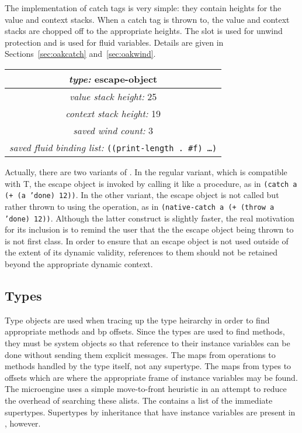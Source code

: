 The implementation of catch tags is very simple: they contain heights
for the value and context stacks.  When a catch tag is thrown to, the
value and context stacks are chopped off to the appropriate heights.
The slot  is used for unwind protection and
 is used for fluid variables.  Details
are given in Sections~\ref{sec:oakcatch} and~\ref{sec:oakwind}.

\begin{center}
\begin{tabular}{|c|}\hline
\emph{type:} escape-object \\\hline
\emph{value stack height:} 25 \\\hline
\emph{context stack height:} 19 \\\hline
\emph{saved wind count:} 3 \\\hline
\emph{saved fluid binding list:} \tt ((print-length . \#f) \ldots)\\\hline
\end{tabular}
\end{center}

Actually, there are two variants of .  In the regular
variant, which is compatible with T, the escape object is invoked by
calling it like a procedure, as in \texttt{(catch a (+ (a 'done) 12))}.
In the other variant, the escape object is not called but rather
thrown to using the  operation, as in \texttt{(native-catch a
(+ (throw a 'done) 12))}.  Although the latter construct is slightly
faster, the real motivation for its inclusion is to remind the user
that the the escape object being thrown to is not first class.  In
order to ensure that an escape object is not used outside of the
extent of its dynamic validity, references to them should not be
retained beyond the appropriate dynamic context.

\subsection{Types}

Type objects are used when tracing up the type heirarchy in order to
find appropriate methods and bp offsets.  Since the types are used to
find methods, they must be system objects so that reference to their
instance variables can be done without sending them explicit messages.
The  maps from operations to methods
handled by the type itself, not any supertype.  The 
maps from types to offsets which are where the appropriate frame of
instance variables may be found.  The microengine uses a simple
move-to-front heuristic in an attempt to reduce the overhead of
searching these alists.  The  contains a list of
the immediate supertypes.  Supertypes by inheritance that have
instance variables are present in , however.


